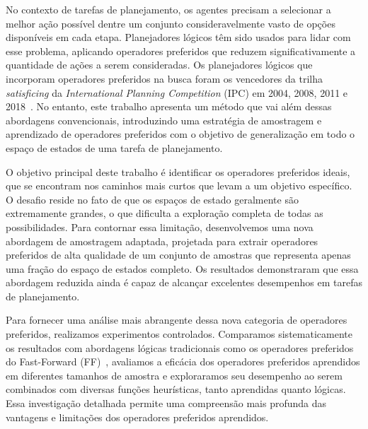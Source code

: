 \documentclass[ppgc,diss,english]{iiufrgs}
\begin{document}
No contexto de tarefas de planejamento, os agentes precisam a selecionar a melhor ação possível dentre um conjunto consideravelmente vasto de opções disponíveis em cada etapa. Planejadores lógicos têm sido usados para lidar com esse problema, aplicando operadores preferidos que reduzem significativamente a quantidade de ações a serem consideradas. Os planejadores lógicos que incorporam operadores preferidos na busca foram os vencedores da trilha \emph{satisficing} da \emph{International Planning Competition} (IPC) em 2004, 2008, 2011 e 2018~\cite{Helmert/2006,Richter.lama.etal/2011,Richter.lama.etal/2011,Seipp-fast.etal/2018}.
No entanto, este trabalho apresenta um método que vai além dessas abordagens convencionais, introduzindo uma estratégia de amostragem e aprendizado de operadores preferidos com o objetivo de generalização em todo o espaço de estados de uma tarefa de planejamento.

O objetivo principal deste trabalho é identificar os operadores preferidos ideais, que se encontram nos caminhos mais curtos que levam a um objetivo específico. O desafio reside no fato de que os espaços de estado geralmente são extremamente grandes, o que dificulta a exploração completa de todas as possibilidades. Para contornar essa limitação, desenvolvemos uma nova abordagem de amostragem adaptada, projetada para extrair operadores preferidos de alta qualidade de um conjunto de amostras que representa apenas uma fração do espaço de estados completo. Os resultados demonstraram que essa abordagem reduzida ainda é capaz de alcançar excelentes desempenhos em tarefas de planejamento.


Para fornecer uma análise mais abrangente dessa nova categoria de operadores preferidos, realizamos experimentos controlados. Comparamos sistematicamente os resultados com abordagens lógicas tradicionais como os operadores preferidos do Fast-Forward (FF)~\cite{Hoffmann.Nebel/2001, Helmert/2006}, avaliamos a eficácia dos operadores preferidos aprendidos em diferentes tamanhos de amostra e exploraramos seu desempenho ao serem combinados com diversas funções heurísticas, tanto aprendidas quanto lógicas. Essa investigação detalhada permite uma compreensão mais profunda das vantagens e limitações dos operadores preferidos aprendidos.
\end{document}
